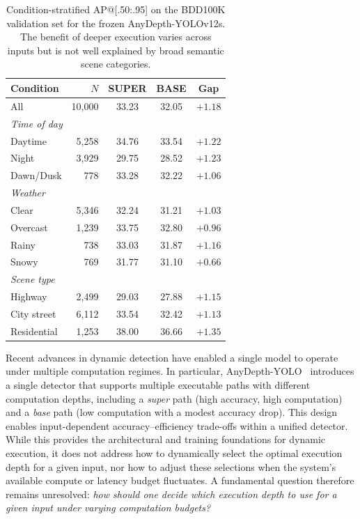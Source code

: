 \begin{table}[t]
\centering
\caption{Condition-stratified AP@[.50:.95] on the BDD100K validation set for the frozen AnyDepth-YOLOv12s. The benefit of deeper execution varies across inputs but is not well explained by broad semantic scene categories.}
\label{tab:condition_stratified}
\begin{tabular}{lrccc}
\toprule
Condition & $N$ & SUPER & BASE & Gap \\
\midrule
All & 10,000 & 33.23 & 32.05 & $+1.18$ \\
\midrule
\multicolumn{5}{l}{\emph{Time of day}} \\
\quad Daytime & 5,258 & 34.76 & 33.54 & $+1.22$ \\
\quad Night & 3,929 & 29.75 & 28.52 & $+1.23$ \\
\quad Dawn/Dusk & 778 & 33.28 & 32.22 & $+1.06$ \\
\midrule
\multicolumn{5}{l}{\emph{Weather}} \\
\quad Clear & 5,346 & 32.24 & 31.21 & $+1.03$ \\
\quad Overcast & 1,239 & 33.75 & 32.80 & $+0.96$ \\
\quad Rainy & 738 & 33.03 & 31.87 & $+1.16$ \\
\quad Snowy & 769 & 31.77 & 31.10 & $+0.66$ \\
\midrule
\multicolumn{5}{l}{\emph{Scene type}} \\
\quad Highway & 2,499 & 29.03 & 27.88 & $+1.15$ \\
\quad City street & 6,112 & 33.54 & 32.42 & $+1.13$ \\
\quad Residential & 1,253 & 38.00 & 36.66 & $+1.35$ \\
\bottomrule
\end{tabular}
\end{table}


Recent advances in dynamic detection have enabled a single model to operate under multiple computation regimes. 
In particular, AnyDepth-YOLO~\cite{kang2026anydepth} introduces a single detector that supports multiple executable paths with different computation depths, including a \emph{super} path (high accuracy, high computation) and a \emph{base} path (low computation with a modest accuracy drop).
This design enables input-dependent accuracy--efficiency trade-offs within a unified detector. 
While this provides the architectural and training foundations for dynamic execution, it does not address how to dynamically select the optimal execution depth for a given input, nor how to adjust these selections when the system's available compute or latency budget fluctuates.
A fundamental question therefore remains unresolved: \textit{how should one decide which execution depth to use for a given input under varying computation budgets?}


